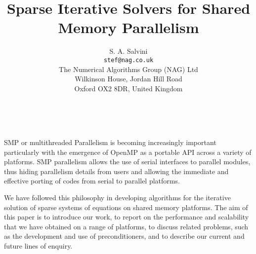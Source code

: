 \documentclass[11pt]{article}
\date{ ~ \hspace{-4mm}}
\title{Sparse Iterative Solvers for Shared Memory Parallelism  }
\author{S. A. Salvini \\ {\tt  stef@nag.co.uk} \\ The Numerical Algorithms Group (NAG) Ltd \\ Wilkinson House, Jordan Hill Road \\ Oxford OX2 8DR, United Kingdom}
\begin{document}
\maketitle
\thispagestyle{empty}





 



SMP or multithreaded Parallelism is becoming increasingly important
particularly with the emergence of OpenMP as a portable API across
a variety of platforms.  SMP parallelism allows the use of serial
interfaces to parallel modules, thus hiding parallelism details
from users and allowing the immediate and effective porting of
codes from serial to parallel platforms.



We have followed this philosophy in developing algorithms for the
iterative solution of sparse systems of equations on shared memory
platforms. The aim of this paper is to introduce our work, to report
on the performance and scalability that we have obtained on a range
of platforms, to discuss related problems, such as the development
and use of preconditioners, and to describe our current and future
lines of enquiry. 
\end{document}
